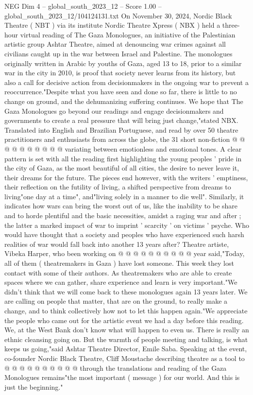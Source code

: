 \begin{textsample}{NEG Dim 4 – global\_south\_2023\_12 – Score 1.00 – global\_south\_2023\_12/104124131.txt}  \label{ex:f4_neg_317}
On November 30, 2024, Nordic Black Theatre ( NBT ) via its institute Nordic Theatre Xpress ( NBX ) held a three-hour virtual reading of The Gaza Monologues, an initiative of the Palestinian artistic group Ashtar Theatre, aimed at denouncing war crimes against all civilians caught up in the war between Israel and Palestine.
The monologues originally written in Arabic by youths of Gaza, aged 13 to 18, prior to a similar war in the city in 2010, is proof that society never learns from its history, but also a call for decisive action from decisionmakers in the ongoing war to prevent a reoccurrence."Despite what you have seen and done so far, there is little to no change on ground, and the dehumanizing suffering continues.
We hope that The Gaza Monologues go beyond our readings and engage decisionmakers and governments to create a real pressure that will bring just change,"stated NBX.
Translated into English and Brazilian Portuguese, and read by over 50 theatre practitioners and enthusiasts from across the globe, the 31 short non-fiction @ @ @ @ @ @ @ @ @ @ variating between emotionless and emotional tones.
A clear pattern is set with all the reading first highlighting the young peoples ' pride in the city of Gaza, as the most beautiful of all cities, the desire to never leave it, their dreams for the future.
The pieces end however, with the writers ' emptiness, their reflection on the futility of living, a shifted perspective from dreams to living"one day at a time", and"living solely in a manner to die well".
Similarly, it indicates how wars can bring the worst out of us, like the inability to be share and to horde plentiful and the basic necessities, amidst a raging war and after ; the latter a marked impact of war to imprint ' scarcity ' on victims ' psyche.
Who would have thought that a society and peoples who have experienced such harsh realities of war would fall back into another 13 years after?
Theatre artiste, Vibeka Harper, who been working on @ @ @ @ @ @ @ @ @ @ year said,"Today, all of them ( theatremakers in Gaza ) have lost someone.
This week they lost contact with some of their authors.
As theatremakers who are able to create spaces where we can gather, share experience and learn is very important."We didn't think that we will come back to these monologues again 13 years later.
We are calling on people that matter, that are on the ground, to really make a change, and to think collectively how not to let this happen again."We appreciate the people who came out for the artistic event we had a day before this reading.
We, at the West Bank don't know what will happen to even us.
There is really an ethnic cleansing going on.
But the warmth of people meeting and talking, is what keeps us going,"said Ashtar Theatre Director, Emile Saba.
Speaking at the event, co-founder Nordic Black Theatre, Cliff Moustache describing theatre as a tool to @ @ @ @ @ @ @ @ @ @ through the translations and reading of the Gaza Monologues remains"the most important ( message ) for our world.
And this is just the beginning."

\end{textsample}
